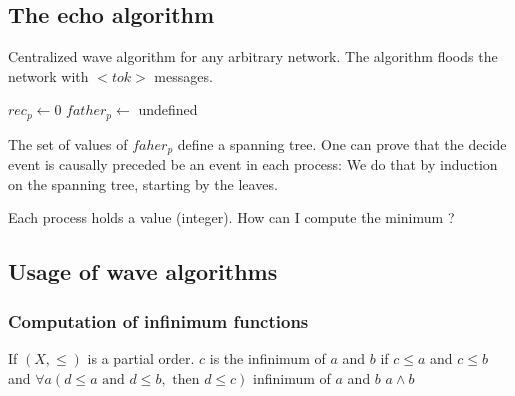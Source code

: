 \subsection{The echo algorithm}
Centralized wave algorithm for any arbitrary network. The algorithm floods the network with $<tok>$ messages.

\begin{algorithm}
$rec_p\leftarrow 0$ 
$father_p \leftarrow$ undefined\\
\end{algorithm}


The set of values of $faher_p$ define a spanning tree. One can prove that the decide event is causally preceded be an event in each process: We do that by induction on the spanning tree, starting by the leaves.

Each process holds a value (integer). How can I compute the minimum ?

\subsection{Usage of wave algorithms}
\subsubsection{Computation of infinimum functions}

If $(X,\leq)$ is a partial order. $c$ is the infinimum of $a$ and $b$ if $c\leq a$ and $c\leq b$ and $\forall a (d\leq a \text{ and } d\leq b, \text{ then } d \leq c)$ infinimum of $a$ and $b$ $a\land b$

